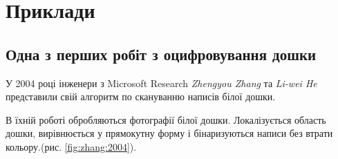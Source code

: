 \section{Приклади}

\vspace{-\baselineskip}

\subsection{Одна з перших робіт з оцифровування дошки}

У 2004 році інженери з Microsoft Research \textit{Zhengyou Zhang}
та \textit{Li-wei He} представили свій алгоритм по скануванню написів
білої дошки.

В їхній роботі \cite{zhang:2004} обробляються фотографії білої дошки. Локалізується область
дошки, вирівнюється у прямокутну форму і бінаризуються написи без втрати
кольору.(рис. \ref{fig:zhang:2004}).
